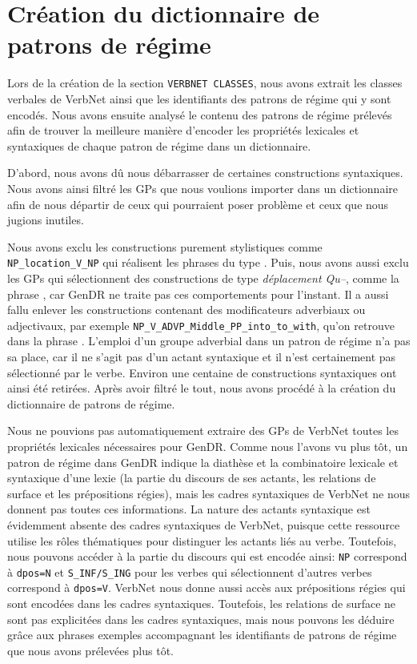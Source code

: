 \section{Création du dictionnaire de patrons de régime}\label{sec:creategpcon}

Lors de la création de la section \texttt{VERBNET CLASSES}, nous avons extrait les classes verbales de VerbNet ainsi que les identifiants des patrons de régime qui y sont encodés. Nous avons ensuite analysé le contenu des patrons de régime prélevés afin de trouver la meilleure manière d'encoder les propriétés lexicales et syntaxiques de chaque patron de régime dans un dictionnaire.

D'abord, nous avons dû nous débarrasser de certaines constructions syntaxiques. Nous avons ainsi filtré les \acp{GP} que nous voulions importer dans un dictionnaire afin de nous départir de ceux qui pourraient poser problème et ceux que nous jugions inutiles.

Nous avons exclu les constructions purement stylistiques comme \lstinline|NP_location_V_NP| qui réalisent les phrases du type . Puis, nous avons aussi exclu les \acp{GP} qui sélectionnent des constructions de type \emph{déplacement Qu--}, comme la phrase , car GenDR ne traite pas ces comportements pour l'instant. Il a aussi fallu enlever les constructions contenant des modificateurs adverbiaux ou adjectivaux, par exemple \lstinline|NP_V_ADVP_Middle_PP_into_to_with|, qu'on retrouve dans la phrase . L'emploi d'un groupe adverbial dans un patron de régime n'a pas sa place, car il ne s'agit pas d'un actant syntaxique et il n'est certainement pas sélectionné par le verbe. Environ une centaine de constructions syntaxiques ont ainsi été retirées. Après avoir filtré le tout, nous avons procédé à la création du dictionnaire de patrons de régime.

Nous ne pouvions pas automatiquement extraire des \acp{GP} de VerbNet toutes les propriétés lexicales nécessaires pour GenDR. Comme nous l'avons vu plus tôt, un patron de régime dans GenDR indique la diathèse et la combinatoire lexicale et syntaxique d'une lexie (la partie du discours de ses actants, les relations de surface et les prépositions régies), mais les cadres syntaxiques de VerbNet ne nous donnent pas toutes ces informations. La nature des actants syntaxique est évidemment absente des cadres syntaxiques de VerbNet, puisque cette ressource utilise les rôles thématiques pour distinguer les actants liés au verbe. Toutefois, nous pouvons accéder à la partie du discours qui est encodée ainsi: \texttt{NP} correspond à \texttt{dpos=N} et \texttt{S\_INF/S\_ING} pour les verbes qui sélectionnent d'autres verbes correspond à \texttt{dpos=V}. VerbNet nous donne aussi accès aux prépositions régies qui sont encodées dans les cadres syntaxiques. Toutefois, les relations de surface ne sont pas explicitées dans les cadres syntaxiques, mais nous pouvons les déduire grâce aux phrases exemples accompagnant les identifiants de patrons de régime que nous avons prélevées plus tôt.

